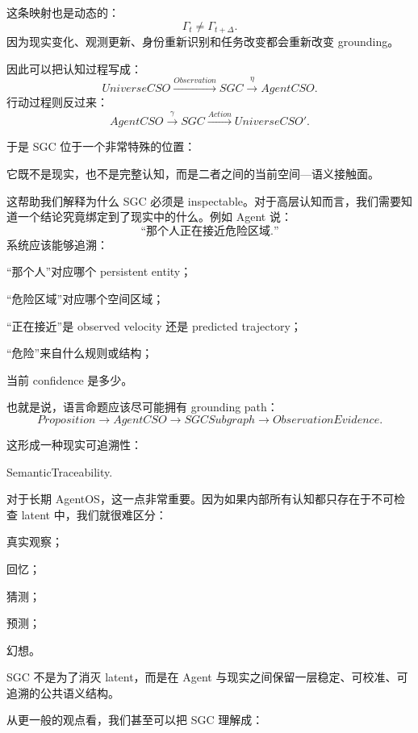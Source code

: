 这条映射也是动态的：
\[
\Gamma_t
\neq
\Gamma_{t+\Delta}.
\]
因为现实变化、观测更新、身份重新识别和任务改变都会重新改变 grounding。

因此可以把认知过程写成：
\[
UniverseCSO
\xrightarrow{Observation}
SGC
\xrightarrow{\eta}
AgentCSO.
\]
行动过程则反过来：
\[
AgentCSO
\xrightarrow{\gamma}
SGC
\xrightarrow{Action}
UniverseCSO'.
\]

于是 SGC 位于一个非常特殊的位置：
\begin{statementbox}
\centering
{}
\end{statementbox}

它既不是现实，也不是完整认知，而是二者之间的当前空间—语义接触面。

这帮助我们解释为什么 SGC 必须是 inspectable。对于高层认知而言，我们需要知道一个结论究竟绑定到了现实中的什么。例如 Agent 说：
\[
\text{``那个人正在接近危险区域.''}
\]
系统应该能够追溯：

“那个人”对应哪个 persistent entity；

“危险区域”对应哪个空间区域；

“正在接近”是 observed velocity 还是 predicted trajectory；

“危险”来自什么规则或结构；

当前 confidence 是多少。

也就是说，语言命题应该尽可能拥有 grounding path：
\[
Proposition
\rightarrow
AgentCSO
\rightarrow
SGCSubgraph
\rightarrow
ObservationEvidence.
\]

这形成一种现实可追溯性：
\begin{statementbox}
SemanticTraceability.
\end{statementbox}

对于长期 AgentOS，这一点非常重要。因为如果内部所有认知都只存在于不可检查 latent 中，我们就很难区分：

真实观察；

回忆；

猜测；

预测；

幻想。

SGC 不是为了消灭 latent，而是在 Agent 与现实之间保留一层稳定、可校准、可追溯的公共语义结构。

从更一般的观点看，我们甚至可以把 SGC 理解成：
\begin{statementbox}
\centering
{}
\end{statementbox}


